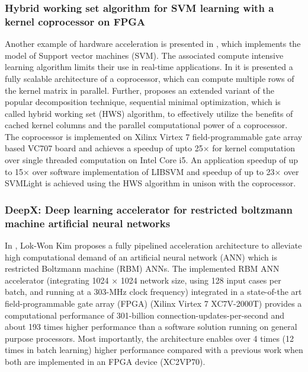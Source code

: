 \subsubsection{Hybrid working set algorithm for SVM learning with a kernel coprocessor on FPGA}
Another example of hardware acceleration is presented in \cite{venkateshan2014hybrid}, which implements the model of Support vector machines (SVM). The associated compute intensive learning algorithm limits their use in real-time applications. In \cite{venkateshan2014hybrid} it is presented a fully scalable architecture of a coprocessor, which can compute multiple rows of the kernel matrix in parallel. Further, \cite{venkateshan2014hybrid} proposes an extended variant of the popular decomposition technique, sequential minimal optimization, which is called hybrid working set (HWS) algorithm, to effectively utilize the beneﬁts of cached kernel columns and the parallel computational power of a coprocessor. The coprocessor is implemented on Xilinx Virtex 7 ﬁeld-programmable gate array based VC707 board and achieves a speedup of upto 25× for kernel computation over single threaded computation on Intel Core i5. An application speedup of up to 15× over software implementation of LIBSVM and speedup of up to 23× over SVMLight is achieved using the HWS algorithm in unison with the coprocessor.

\subsubsection{DeepX: Deep learning accelerator for restricted boltzmann machine artificial neural networks}
In \cite{kim2017deepx}, Lok-Won Kim proposes a fully pipelined acceleration architecture to alleviate high computational demand of an artiﬁcial neural network (ANN) which is restricted Boltzmann machine (RBM) ANNs. The implemented RBM ANN accelerator (integrating 1024 × 1024 network size, using 128 input cases per batch, and running at a 303-MHz clock frequency) integrated in a state-of-the art ﬁeld-programmable gate array (FPGA) (Xilinx Virtex 7 XC7V-2000T) provides a computational performance of 301-billion connection-updates-per-second and about 193 times higher performance than a software solution running on general purpose processors. Most importantly, the architecture enables over 4 times (12 times in batch learning) higher performance compared with a previous work when both are implemented in an FPGA device (XC2VP70).

